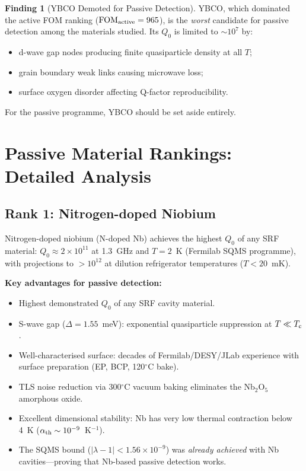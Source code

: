 \documentclass[11pt]{article}
\theoremstyle{definition}
\newtheorem{finding}[theorem]{Finding}
\theoremstyle{remark}
\newcommand{\ee}[1]{\times 10^{#1}}
\newcommand{\lambdabound}{1.56\ee{-9}}
\newcommand{\Tc}{T_{\rm c}}
\newcommand{\FOMactive}{\mathrm{FOM}_{\rm active}}
\newcommand{\lam}{|\lambda-1|}
\begin{document}
\begin{finding}[YBCO Demoted for Passive Detection]
\label{find:ybco_demoted}
YBCO, which dominated the active FOM ranking ($\FOMactive = 965$),
is the \emph{worst} candidate for passive detection among the materials
studied. Its $Q_0$ is limited to $\sim 10^7$ by:
\begin{itemize}[nosep]
  \item d-wave gap nodes producing finite quasiparticle density at all $T$;
  \item grain boundary weak links causing microwave loss;
  \item surface oxygen disorder affecting Q-factor reproducibility.
\end{itemize}
For the passive programme, YBCO should be set aside entirely.
\end{finding}


\section{Passive Material Rankings: Detailed Analysis}
\label{sec:passive_ranking}

\subsection{Rank 1: Nitrogen-doped Niobium}

Nitrogen-doped niobium (N-doped Nb) achieves the highest $Q_0$ of any
SRF material: $Q_0 \approx 2\ee{11}$ at 1.3~GHz and $T = 2$~K
(Fermilab SQMS programme), with projections to $>10^{12}$ at dilution
refrigerator temperatures ($T < 20$~mK).

\textbf{Key advantages for passive detection:}
\begin{itemize}[nosep]
  \item Highest demonstrated $Q_0$ of any SRF cavity material.
  \item S-wave gap ($\Delta = 1.55$~meV): exponential quasiparticle
    suppression at $T \ll \Tc$.
  \item Well-characterised surface: decades of Fermilab/DESY/JLab
    experience with surface preparation (EP, BCP, 120$^\circ$C bake).
  \item TLS noise reduction via 300$^\circ$C vacuum baking eliminates
    the Nb$_2$O$_5$ amorphous oxide.
  \item Excellent dimensional stability: Nb has very low thermal
    contraction below 4~K ($\alpha_{\rm th} \sim 10^{-9}$~K$^{-1}$).
  \item The SQMS bound ($\lam < \lambdabound$) was \emph{already achieved}
    with Nb cavities---proving that Nb-based passive detection works.
\end{itemize}
\end{document}
